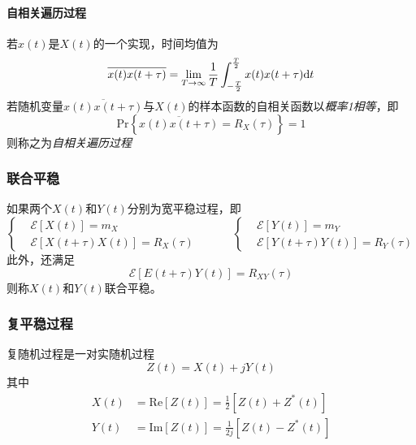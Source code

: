     \paragraph{自相关遍历过程}\mbox{}

    若$x(t)$是$X(t)$的一个实现，时间均值为
    \begin{equation}
        \overline{x(t)x(t+\tau)}=\lim_{T\to\infty}\frac{1}{T}\int_{-\frac{T}{2}}^{\frac{T}{2}}x(t)x(t+\tau)\text{\upshape d} t
    \end{equation}
    若随机变量$\overline{x(t)x(t+\tau)}$与$X(t)$的样本函数的自相关函数以\emph{概率1相等}，即
    \begin{equation}
        \text{Pr}\left\{\overline{x(t)x(t+\tau)}=R_X(\tau) \right\}=1
    \end{equation}
    则称之为\emph{自相关遍历过程}

    \subsubsection{联合平稳}
    如果两个$X(t)$和$Y(t)$分别为宽平稳过程，即
    \begin{equation*}
        \left\{\begin{aligned}
            &\mathscr{E}[X(t)]=m_X\\
            &\mathscr{E}[X(t+\tau)X(t)]=R_X(\tau)
        \end{aligned}\right.
        \hspace{3em}
        \left\{\begin{aligned}
            &\mathscr{E}[Y(t)]=m_Y\\
            &\mathscr{E}[Y(t+\tau)Y(t)]=R_Y(\tau)
        \end{aligned}\right.
    \end{equation*}
    此外，还满足
    \begin{equation}
        \mathscr{E}[E(t+\tau)Y(t)]=R_{XY}(\tau)
    \end{equation}
    则称$X(t)$和$Y(t)$联合平稳。

    \subsubsection{复平稳过程}
    复随机过程是一对实随机过程
    \begin{equation}
        Z(t)=X(t)+jY(t)
    \end{equation}
    其中
    \begin{align}
        X(t)&=\text{Re}[Z(t)]=\frac{1}{2}[Z(t)+Z^*(t)]\\
        Y(t)&=\text{Im}[Z(t)]=\frac{1}{2j}[Z(t)-Z^*(t)]
    \end{align}

